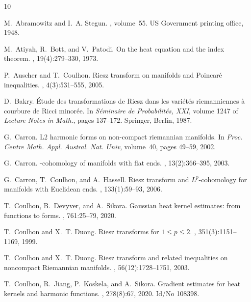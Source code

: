 \documentclass[12pt]{amsart}
\begin{document}
\begin{thebibliography}{10}
	
	M.~Abramowitz and I.~A. Stegun.
	, volume~55.
	\newblock US Government printing office, 1948.
	
	M.~Atiyah, R.~Bott, and V.~Patodi.
	\newblock On the heat equation and the index theorem.
	, 19(4):279--330, 1973.
	
	P.~Auscher and T.~Coulhon.
	\newblock Riesz transform on manifolds and {P}oincar\'e{} inequalities.
	, 4(3):531--555, 2005.
	
	D.~Bakry.
	\newblock \'{E}tude des transformations de {R}iesz dans les vari\'{e}t\'{e}s
	riemanniennes \`a courbure de {R}icci minor\'{e}e.
	\newblock In {\em S\'{e}minaire de {P}robabilit\'{e}s, {XXI}}, volume 1247 of
	{\em Lecture Notes in Math.}, pages 137--172. Springer, Berlin, 1987.
	
	G.~Carron.
	\newblock L2 harmonic forms on non-compact riemannian manifolds.
	\newblock In {\em Proc. Centre Math. Appl. Austral. Nat. Univ}, volume~40,
	pages 49--59, 2002.
	
	G.~Carron.
	-cohomology of manifolds with flat ends.
	, 13(2):366--395, 2003.
	
	G.~Carron, T.~Coulhon, and A.~Hassell.
	\newblock Riesz transform and {$L^p$}-cohomology for manifolds with {E}uclidean
	ends.
	, 133(1):59--93, 2006.
	
	T.~Coulhon, B.~Devyver, and A.~Sikora.
	\newblock Gaussian heat kernel estimates: from functions to forms.
	, 761:25--79, 2020.
	
	T.~Coulhon and X.~T. Duong.
	\newblock Riesz transforms for {$1\leq p\leq 2$}.
	, 351(3):1151--1169, 1999.
	
	T.~Coulhon and X.~T. Duong.
	\newblock Riesz transform and related inequalities on noncompact {R}iemannian
	manifolds.
	, 56(12):1728--1751, 2003.
	
	T.~Coulhon, R.~Jiang, P.~Koskela, and A.~Sikora.
	\newblock Gradient estimates for heat kernels and harmonic functions.
	, 278(8):67, 2020.
	\newblock Id/No 108398.
	

\end{thebibliography}
\end{document}
